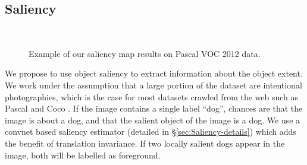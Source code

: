\documentclass[british,10pt,twocolumn,letterpaper]{article}
\newcommand{\lyxdot}{.}
\begin{document}
\subsection{\label{subsec:Saliency}Saliency}


\begin{figure*}
\begin{centering}
~~\vspace{-1em}
\par\end{centering}
\caption{\label{fig:saliency-examples}Example of our saliency map results
on Pascal VOC 2012 data.}
\end{figure*}


\noindent
We propose to use object saliency to extract information about the
object extent. We work under the assumption that a large portion of
the dataset are intentional photographies, which is the case for most
datasets crawled from the web such as Pascal \cite{pascal-voc-2012}
and Coco \cite{Lin2014EccvCoco}. If the image contains a single label
``dog'', chances are that the image is about a dog, and that the
salient object of the image is a dog. We use a convnet based saliency
estimator (detailed in \S \ref{sec:Saliency-details}) which
adds the benefit of translation invariance. If two locally salient
dogs appear in the image, both will be labelled as foreground.
\end{document}
